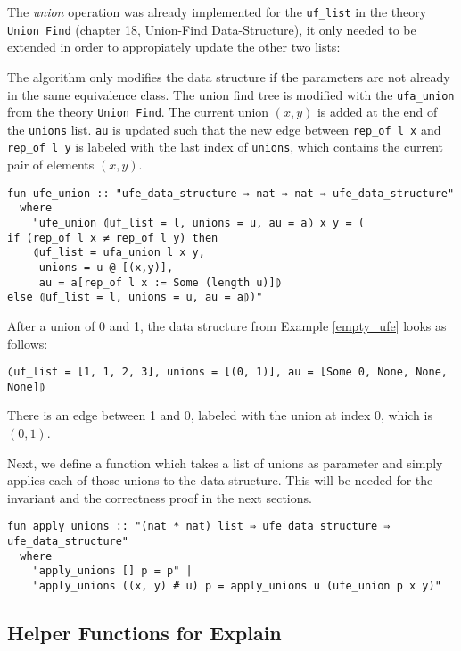 The \emph{union} operation was already implemented for the \lstinline{uf_list} in the theory \lstinline{Union_Find} \cite{Sep} (chapter 18, Union-Find Data-Structure), it only needed to be extended in order to appropiately update the other two lists:

The algorithm only modifies the data structure if the parameters are not already in the same equivalence class.
The union find tree is modified with the \lstinline{ufa_union} from the theory \lstinline{Union_Find}\cite{Sep}.
The current union $(x, y)$ is added at the end of the \lstinline{unions} list.
\lstinline{au} is updated such that the new edge between \lstinline{rep_of l x} and \lstinline{rep_of l y} is labeled with the last index of \lstinline{unions}, which contains the current pair of elements $(x, y)$.

\begin{lstlisting}
fun ufe_union :: "ufe_data_structure ⇒ nat ⇒ nat ⇒ ufe_data_structure"
  where
    "ufe_union ⦇uf_list = l, unions = u, au = a⦈ x y = (
if (rep_of l x ≠ rep_of l y) then
    ⦇uf_list = ufa_union l x y,
     unions = u @ [(x,y)],
     au = a[rep_of l x := Some (length u)]⦈
else ⦇uf_list = l, unions = u, au = a⦈)"
\end{lstlisting}

\begin{exmp}
After a union of 0 and 1, the data structure from Example \ref{empty_ufe} looks as follows:
\begin{lstlisting}
⦇uf_list = [1, 1, 2, 3], unions = [(0, 1)], au = [Some 0, None, None, None]⦈
\end{lstlisting}
There is an edge between 1 and 0, labeled with the union at index 0, which is $(0,1)$.
\end{exmp}

Next, we define a function which takes a list of unions as parameter and simply applies each of those unions to the data structure. This will be needed for the invariant and the correctness proof in the next sections.

\begin{lstlisting}
fun apply_unions :: "(nat * nat) list ⇒ ufe_data_structure ⇒ ufe_data_structure"
  where
    "apply_unions [] p = p" |
    "apply_unions ((x, y) # u) p = apply_unions u (ufe_union p x y)"
\end{lstlisting}

\subsection{Helper Functions for Explain}

